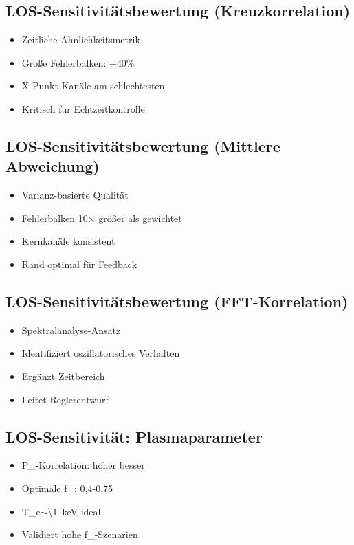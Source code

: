 \documentclass[11pt,a4paper]{article}
\begin{document}
\subsection{LOS-Sensitivitätsbewertung (Kreuzkorrelation)}

\begin{itemize}
\item Zeitliche Ähnlichkeitsmetrik
\item Große Fehlerbalken: $\pm$40\%
\item X-Punkt-Kanäle am schlechtesten
\item Kritisch für Echtzeitkontrolle
\end{itemize}

\subsection{LOS-Sensitivitätsbewertung (Mittlere Abweichung)}

\begin{itemize}
\item Varianz-basierte Qualität
\item Fehlerbalken 10$\times$ größer als gewichtet
\item Kernkanäle konsistent
\item Rand optimal für Feedback
\end{itemize}

\subsection{LOS-Sensitivitätsbewertung (FFT-Korrelation)}

\begin{itemize}
\item Spektralanalyse-Ansatz
\item Identifiziert oszillatorisches Verhalten
\item Ergänzt Zeitbereich
\item Leitet Reglerentwurf
\end{itemize}

\subsection{LOS-Sensitivität: Plasmaparameter}

\begin{itemize}
\item P_{}-Korrelation: höher besser
\item Optimale f_{}: 0,4-0,75
\item T_e$\sim$\SI{\1}{keV} ideal
\item Validiert hohe f_{}-Szenarien
\end{itemize}
\end{document}
